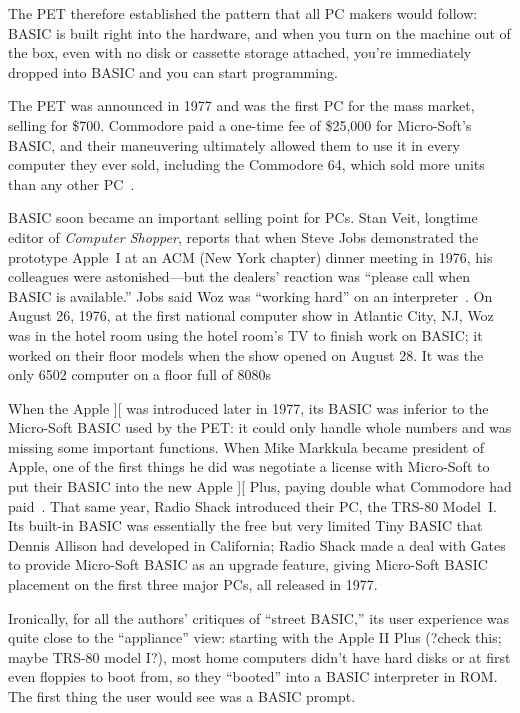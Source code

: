 The 
PET therefore established the pattern that all PC makers would follow:
BASIC is built right into the hardware, and when you turn on the
machine out of the box, even with no disk or cassette storage attached, you're
immediately dropped into BASIC and you can start programming.

The PET was announced in 1977 and was the first PC for the mass market,
selling for \$700.
Commodore paid a one-time fee of \$25,000 for Micro-Soft's BASIC, and
their maneuvering ultimately allowed them to use it in every computer
they ever sold, including the Commodore 64, which sold more units than
any other PC~\cite{commodore}.

BASIC soon became an important selling point for PCs.  Stan Veit,
longtime editor of \emph{Computer Shopper}, reports 
that when Steve Jobs demonstrated the prototype Apple~I at an ACM (New
York chapter) dinner meeting in 1976, his colleagues were
astonished---but the dealers' reaction was ``please call when BASIC is
available.''  Jobs said Woz was ``working hard'' on an
interpreter~\cite[pp. 92ff]{veit}.
On August 26, 1976, at the first national computer show in Atlantic City,
NJ, Woz was in the hotel room using the hotel room's TV to finish work
on BASIC; it worked on their floor models when the show opened on August
28.  It was the only 6502 computer on a floor full of 8080s

When the Apple ][
was introduced later in 1977, its BASIC was inferior to the 
Micro-Soft BASIC used by the PET: it could only handle whole numbers and
was missing some important functions.  When Mike Markkula became
president of Apple, one of the first things he did was negotiate a
license with Micro-Soft to put their BASIC into the new Apple ][ Plus,
paying double what Commodore had paid~\cite[p. 114]{commodore}.  That
same year, Radio Shack introduced their PC, the TRS-80 Model~I.  Its
built-in BASIC was essentially the free but very limited
Tiny BASIC that Dennis Allison
had developed in California; Radio Shack made a deal with Gates to
provide Micro-Soft BASIC as an upgrade feature, giving Micro-Soft BASIC
placement on the first three major PCs, all released in 1977.


Ironically, for all the authors' critiques of ``street BASIC,'' its user
experience was quite close to the ``appliance'' view: starting with the
Apple II Plus (?check this; maybe TRS-80 model I?), most home computers
didn't have hard disks or at first even floppies to boot from, so they
``booted'' into a BASIC interpreter in ROM.  The first thing the user
would see was a BASIC prompt. 


